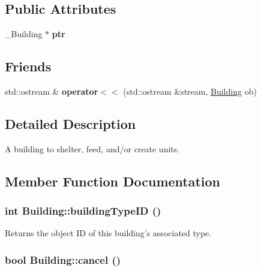 \subsection*{Public Attributes}
\begin{CompactItemize}
\item 
\hypertarget{classBuilding_fa95e2212d89420e3b545aec2c45e8ae}{
\_\-Building $\ast$ \textbf{ptr}}
\label{classBuilding_fa95e2212d89420e3b545aec2c45e8ae}

\end{CompactItemize}
\subsection*{Friends}
\begin{CompactItemize}
\item 
\hypertarget{classBuilding_cdf7bf2ad24fb215d84b8fda0741c0ea}{
std::ostream \& \textbf{operator$<$$<$} (std::ostream \&stream, \hyperlink{classBuilding}{Building} ob)}
\label{classBuilding_cdf7bf2ad24fb215d84b8fda0741c0ea}

\end{CompactItemize}


\subsection{Detailed Description}
A building to shelter, feed, and/or create units. 

\subsection{Member Function Documentation}
\hypertarget{classBuilding_702e3a297487ed7672fdf3a141fa8944}{
\subsubsection[{buildingTypeID}]{\setlength{\rightskip}{0pt plus 5cm}int Building::buildingTypeID ()}}
\label{classBuilding_702e3a297487ed7672fdf3a141fa8944}


Returns the object ID of this building's associated type. \hypertarget{classBuilding_18da3fd55e1b9fe2ef198b0268eb439f}{
\subsubsection[{cancel}]{\setlength{\rightskip}{0pt plus 5cm}bool Building::cancel ()}}
\label{classBuilding_18da3fd55e1b9fe2ef198b0268eb439f}


